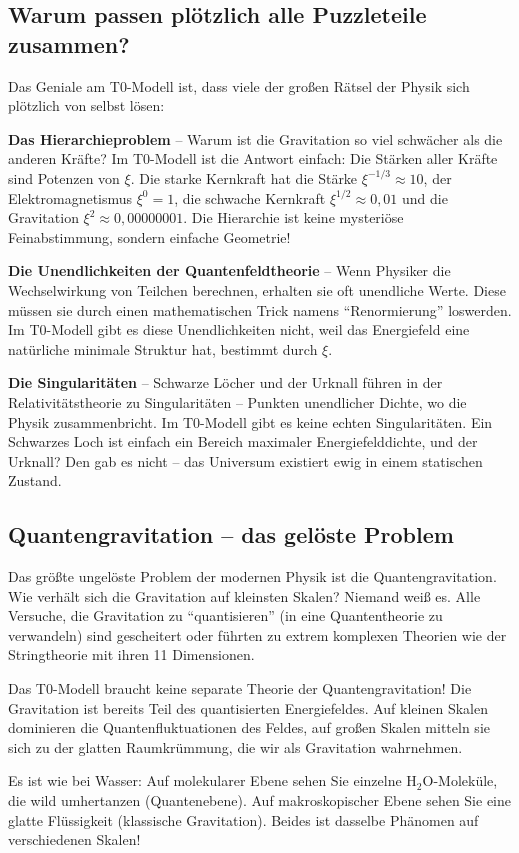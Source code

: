 \documentclass[12pt,a4paper]{article}
\newcommand{\xipar}{\ensuremath{\xi}}
\begin{document}
	\subsection{Warum passen plötzlich alle Puzzleteile zusammen?}
	
	Das Geniale am T0-Modell ist, dass viele der großen Rätsel der Physik sich plötzlich von selbst lösen:
	
	\textbf{Das Hierarchieproblem} -- Warum ist die Gravitation so viel schwächer als die anderen Kräfte? Im T0-Modell ist die Antwort einfach: Die Stärken aller Kräfte sind Potenzen von $\xipar$. Die starke Kernkraft hat die Stärke $\xipar^{-1/3} \approx 10$, der Elektromagnetismus $\xipar^0 = 1$, die schwache Kernkraft $\xipar^{1/2} \approx 0,01$ und die Gravitation $\xipar^2 \approx 0,00000001$. Die Hierarchie ist keine mysteriöse Feinabstimmung, sondern einfache Geometrie!
	
	\textbf{Die Unendlichkeiten der Quantenfeldtheorie} -- Wenn Physiker die Wechselwirkung von Teilchen berechnen, erhalten sie oft unendliche Werte. Diese müssen sie durch einen mathematischen Trick namens ``Renormierung'' loswerden. Im T0-Modell gibt es diese Unendlichkeiten nicht, weil das Energiefeld eine natürliche minimale Struktur hat, bestimmt durch $\xipar$.
	
	\textbf{Die Singularitäten} -- Schwarze Löcher und der Urknall führen in der Relativitätstheorie zu Singularitäten -- Punkten unendlicher Dichte, wo die Physik zusammenbricht. Im T0-Modell gibt es keine echten Singularitäten. Ein Schwarzes Loch ist einfach ein Bereich maximaler Energiefelddichte, und der Urknall? Den gab es nicht -- das Universum existiert ewig in einem statischen Zustand.
	
	\subsection{Quantengravitation -- das gelöste Problem}
	
	Das größte ungelöste Problem der modernen Physik ist die Quantengravitation. Wie verhält sich die Gravitation auf kleinsten Skalen? Niemand weiß es. Alle Versuche, die Gravitation zu ``quantisieren'' (in eine Quantentheorie zu verwandeln) sind gescheitert oder führten zu extrem komplexen Theorien wie der Stringtheorie mit ihren 11 Dimensionen.
	
	\begin{important}
		Das T0-Modell braucht keine separate Theorie der Quantengravitation! Die Gravitation ist bereits Teil des quantisierten Energiefeldes. Auf kleinen Skalen dominieren die Quantenfluktuationen des Feldes, auf großen Skalen mitteln sie sich zu der glatten Raumkrümmung, die wir als Gravitation wahrnehmen.
		
		Es ist wie bei Wasser: Auf molekularer Ebene sehen Sie einzelne H$_2$O-Moleküle, die wild umhertanzen (Quantenebene). Auf makroskopischer Ebene sehen Sie eine glatte Flüssigkeit (klassische Gravitation). Beides ist dasselbe Phänomen auf verschiedenen Skalen!
	\end{important}
	
\end{document}
